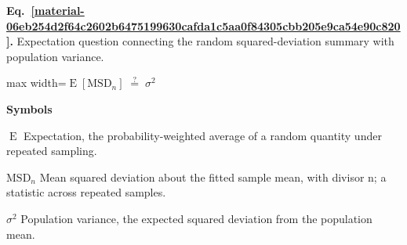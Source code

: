 \documentclass[11pt,a4paper]{article}
\begin{document}
\par\medskip
\begin{samepage}
\label{material-06eb254d2f64c2602b6475199630cafda1c5aa0f84305cbb205e9ca54e90c820}
\noindent\textbf{Eq.~\ref*{material-06eb254d2f64c2602b6475199630cafda1c5aa0f84305cbb205e9ca54e90c820}.} Expectation question connecting the random squared-deviation summary with population variance.\par\nopagebreak
\begin{center}\begin{adjustbox}{max width=\linewidth}$\displaystyle \operatorname{E}[\mathrm{MSD}_n]\;\overset{?}{=}\;\sigma^2$\end{adjustbox}\end{center}

\par\noindent\textbf{Symbols}

\par\noindent\textbf{\(\operatorname{E}\)} Expectation, the probability-weighted average of a random quantity under repeated sampling.

\par\noindent\textbf{\(\mathrm{MSD}_n\)} Mean squared deviation about the fitted sample mean, with divisor n; a statistic across repeated samples.

\par\noindent\textbf{\(\sigma^2\)} Population variance, the expected squared deviation from the population mean.

\end{samepage}
\medskip
\end{document}
